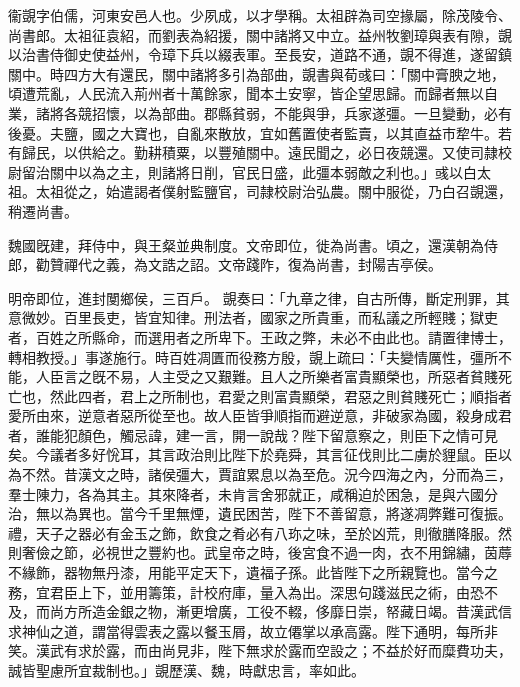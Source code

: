 \begin{pinyinscope}
 
 
 衞覬字伯儒，河東安邑人也。少夙成，以才學稱。太祖辟為司空掾屬，除茂陵令、尚書郎。太祖征袁紹，而劉表為紹援，關中諸將又中立。益州牧劉璋與表有隙，覬以治書侍御史使益州，令璋下兵以綴表軍。至長安，道路不通，覬不得進，遂留鎮關中。時四方大有還民，關中諸將多引為部曲，覬書與荀彧曰：「關中膏腴之地，頃遭荒亂，人民流入荊州者十萬餘家，聞本土安寧，皆企望思歸。而歸者無以自業，諸將各競招懷，以為部曲。郡縣貧弱，不能與爭，兵家遂彊。一旦變動，必有後憂。夫鹽，國之大寶也，自亂來散放，宜如舊置使者監賣，以其直益巿犂牛。若有歸民，以供給之。勤耕積粟，以豐殖關中。遠民聞之，必日夜競還。又使司隷校尉留治關中以為之主，則諸將日削，官民日盛，此彊本弱敵之利也。」彧以白太祖。太祖從之，始遣謁者僕射監鹽官，司隷校尉治弘農。關中服從，乃白召覬還，稍遷尚書。
 
 
 魏國旣建，拜侍中，與王粲並典制度。文帝即位，徙為尚書。頃之，還漢朝為侍郎，勸贊禪代之義，為文誥之詔。文帝踐阼，復為尚書，封陽吉亭侯。
 
 
明帝即位，進封閺鄉侯，三百戶。
 覬奏曰：「九章之律，自古所傳，斷定刑罪，其意微妙。百里長吏，皆宜知律。刑法者，國家之所貴重，而私議之所輕賤；獄吏者，百姓之所縣命，而選用者之所卑下。王政之弊，未必不由此也。請置律博士，轉相教授。」事遂施行。時百姓凋匱而役務方殷，覬上疏曰：「夫變情厲性，彊所不能，人臣言之旣不易，人主受之又艱難。且人之所樂者富貴顯榮也，所惡者貧賤死亡也，然此四者，君上之所制也，君愛之則富貴顯榮，君惡之則貧賤死亡；順指者愛所由來，逆意者惡所從至也。故人臣皆爭順指而避逆意，非破家為國，殺身成君者，誰能犯顏色，觸忌諱，建一言，開一說哉？陛下留意察之，則臣下之情可見矣。今議者多好恱耳，其言政治則比陛下於堯舜，其言征伐則比二虜於貍鼠。臣以為不然。昔漢文之時，諸侯彊大，賈誼累息以為至危。況今四海之內，分而為三，羣士陳力，各為其主。其來降者，未肯言舍邪就正，咸稱迫於困急，是與六國分治，無以為異也。當今千里無煙，遺民困苦，陛下不善留意，將遂凋弊難可復振。禮，天子之器必有金玉之飾，飲食之肴必有八珎之味，至於凶荒，則徹膳降服。然則奢儉之節，必視世之豐約也。武皇帝之時，後宮食不過一肉，衣不用錦繡，茵蓐不緣飾，器物無丹漆，用能平定天下，遺福子孫。此皆陛下之所親覽也。當今之務，宜君臣上下，並用籌策，計校府庫，量入為出。深思句踐滋民之術，由恐不及，而尚方所造金銀之物，漸更增廣，工役不輟，侈靡日崇，帑藏日竭。昔漢武信求神仙之道，謂當得雲表之露以餐玉屑，故立僊掌以承高露。陛下通明，每所非笑。漢武有求於露，而由尚見非，陛下無求於露而空設之；不益於好而糜費功夫，誠皆聖慮所宜裁制也。」覬歷漢、魏，時獻忠言，率如此。
 

\end{pinyinscope}

